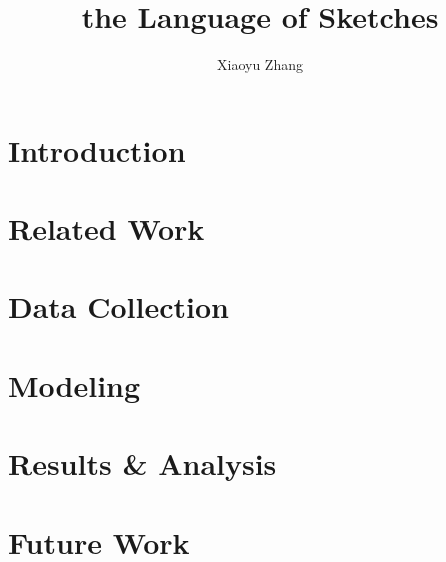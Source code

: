 \documentclass[twoside]{report}
\begin{document}
    \title{the Language of Sketches}
\author{Xiaoyu Zhang}

\beforepreface
{}


\afterpreface

\chapter{Introduction} \label{introductionChapter}


\chapter{Related Work} \label{relatedWorkChapter}


\chapter{Data Collection} \label{dataChapter}


\chapter{Modeling} \label{modelingChapter}


\chapter{Results \& Analysis} \label{analysisChapter}



\chapter{Future Work} \label{futureChapter}


\appendix

\renewcommand{\bibname}{Bibliography}


\end{document}
